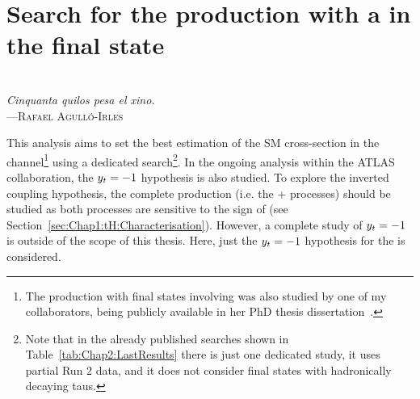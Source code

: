 \begin{comment}
%
%
asdf
\end{comment}

\chapter{Search for the \tHq production with a \tauhad in the final state}

\label{chap:Analysis_tH}
\vspace*{0.1 cm} 
\hspace*{300pt} \\
\hspace*{220pt} \textit{Cinquanta quilos pesa el xino.} \\
\hspace*{240pt} ---\textsc{Rafael Agulló-Irles} \\%
\vspace*{2cm} 


This analysis aims to set the best estimation of the \tHq%
SM cross-section in the \dileptau channel\footnote{The \tHq production with final states involving \tauhad  was also studied
by one of my collaborators, being publicly available in her PhD thesis dissertation~\cite{ThesisTanja}.} using a 
dedicated search\footnote{Note that in the already published searches shown in 
Table~\ref{tab:Chap2:LastResults} there is just one dedicated \tHq study, it uses partial Run 2 data, and it does not consider final states with hadronically
decaying taus.}.
In the ongoing analysis within the ATLAS collaboration, the $y_{t} = -1$ hypothesis is also studied. 
To explore  the inverted coupling hypothesis, the complete \tH production (i.e. the \tHq + \tWH processes) should be studied 
as both processes are sensitive to the sign of \yt (see Section~\ref{sec:Chap1:tH:Characterisation}).
However, a complete study of $y_{t} = -1$ is outside of the scope of this thesis.
Here, just the $y_{t} = -1$ hypothesis for the \tHq is considered. 

